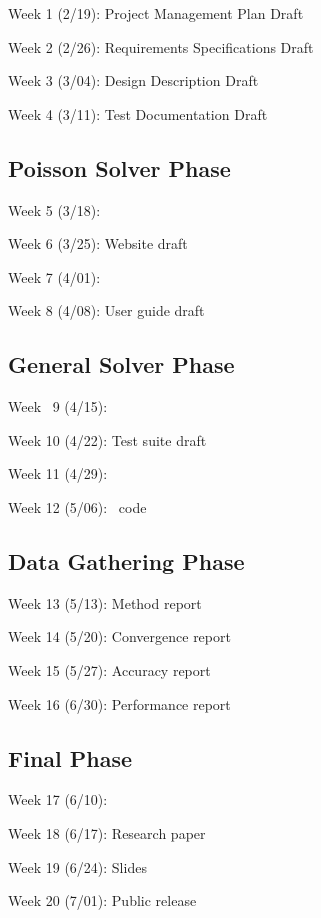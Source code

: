 \documentclass[11pt]{article}
\begin{document}
\BeginDESCRIPTION
\item[Week 1 (2/19): ] Project Management Plan Draft
\item[Week 2 (2/26): ] Requirements Specifications Draft
\item[Week 3 (3/04): ] Design Description Draft
\item[Week 4 (3/11): ] Test Documentation Draft
\EndDESCRIPTION

\subsection{Poisson Solver Phase}

\BeginDESCRIPTION
\item[Week 5 (3/18): ] 
\item[Week 6 (3/25): ]  Website draft
\item[Week 7 (4/01): ]
\item[Week 8 (4/08): ]  User guide draft
\EndDESCRIPTION

\subsection{General Solver Phase}

\BeginDESCRIPTION
\item[Week \, 9 (4/15): ]
\item[Week 10 (4/22): ]  Test suite draft
\item[Week 11 (4/29): ]
\item[Week 12 (5/06): ]  \amrSolve\ code
\EndDESCRIPTION

\subsection{Data Gathering Phase}

\BeginDESCRIPTION
\item[Week 13 (5/13): ] Method report
\item[Week 14 (5/20): ] Convergence report
\item[Week 15 (5/27): ] Accuracy report
\item[Week 16 (6/30): ] Performance report
\EndDESCRIPTION

\subsection{Final Phase}

\BeginDESCRIPTION
\item[Week 17 (6/10): ] 
\item[Week 18 (6/17): ]  Research paper
\item[Week 19 (6/24): ]  Slides
\item[Week 20 (7/01): ] Public release
\EndDESCRIPTION

\end{document}

